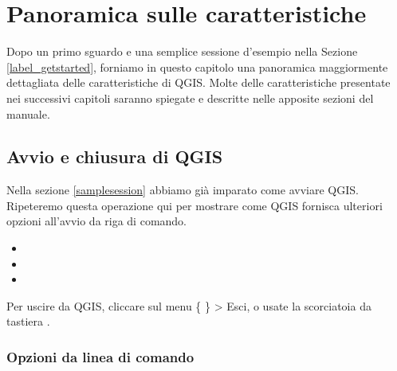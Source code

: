
\section{Panoramica sulle caratteristiche}\label{feature_glance}


Dopo un primo sguardo e una semplice sessione d'esempio nella Sezione \ref{label_getstarted},
forniamo in questo capitolo una panoramica maggiormente dettagliata delle caratteristiche di QGIS. 
Molte delle caratteristiche presentate nei successivi capitoli saranno spiegate
e descritte nelle apposite sezioni del manuale.

\subsection{Avvio e chiusura di QGIS}\label{label_startinqgis}

Nella sezione \ref{samplesession} abbiamo già imparato come avviare QGIS. Ripeteremo 
questa operazione qui per mostrare come QGIS fornisca ulteriori opzioni all'avvio da riga di comando. 

\begin{itemize}
\item {} 
\item {}
\item {}
\end{itemize} 

Per uscire da QGIS, cliccare sul menu \{\nix{} \} > Esci,
o usate la scorciatoia da tastiera .

\subsubsection{Opzioni da linea di comando}
\label{label_commandline}

